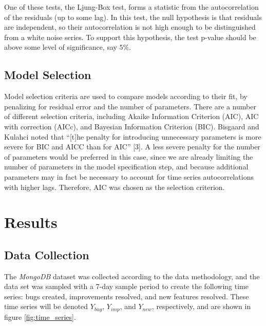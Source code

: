 \documentclass[letterpaper]{report}
\begin{document}
One of these tests, the Ljung-Box test, forms a statistic from the autocorrelation of the residuals (up to some lag). In this test, the null hypothesis is that residuals are independent, so their autocorrelation is not high enough to be distinguished from a white noise series. To support this hypothesis, the test p-value should be above some level of significance, say $5\%$. 


\section*{Model Selection}
Model selection criteria are used to compare models according to their fit, by penalizing for residual error and the number of parameters. There are a number of different selection criteria, including Akaike Information Criterion (AIC), AIC with correction (AICc), and Bayesian Information Criterion (BIC). Bisgaard and Kulahci noted that “[t]he penalty for introducing unnecessary parameters is more severe for BIC and AICC than for AIC” [3]. A less severe penalty for the number of parameters would be preferred in this case, since we are already limiting the number of parameters in the model specification step, and because additional parameters may in fact be necessary to account for time series autocorrelations with higher lags. Therefore, AIC was chosen as the selection criterion.


\chapter{Results}
\label{sec:results}

\section*{Data Collection}

The \textit{MongoDB} dataset was collected according to the data methodology, and the data set was sampled with a 7-day sample period to create the following time series: bugs created, improvements resolved, and new features resolved. These time series will be denoted $Y_{bug}$, $Y_{imp}$, and $Y_{new}$, respectively, and are shown in figure \ref{fig:time_series}.
\end{document}
